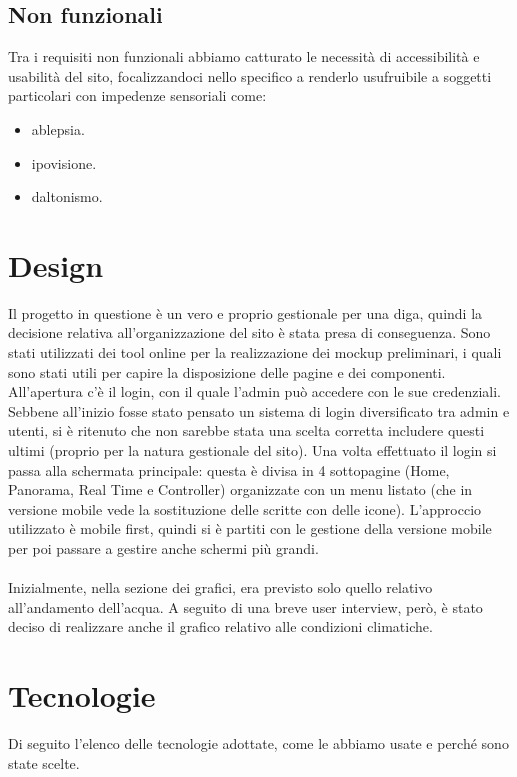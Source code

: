 \documentclass{article}
\begin{document}
\subsection{Non funzionali}
Tra i requisiti non funzionali abbiamo catturato le necessità di accessibilità e usabilità del sito, focalizzandoci nello specifico a renderlo usufruibile a soggetti particolari con impedenze sensoriali come:
\begin{itemize}
	\item ablepsia.
	\item ipovisione.
	\item daltonismo.
\end{itemize}

\section{Design}
Il progetto in questione è un vero e proprio gestionale per una diga, quindi la decisione relativa all'organizzazione del sito è stata presa di conseguenza. Sono stati utilizzati dei tool online per la realizzazione dei mockup preliminari, i quali sono stati utili per capire la disposizione delle pagine e dei componenti.\\
All'apertura c'è il login, con il quale l'admin può accedere con le sue credenziali. Sebbene all'inizio fosse stato pensato un sistema di login diversificato tra admin e utenti, si è ritenuto che non sarebbe stata una scelta corretta includere questi ultimi (proprio per la natura gestionale del sito). Una volta effettuato il login si passa alla schermata principale: questa è divisa in 4 sottopagine (Home, Panorama, Real Time e Controller) organizzate con un menu listato (che in versione mobile vede la sostituzione delle scritte con delle icone). L'approccio utilizzato è mobile first, quindi si è partiti con le gestione della versione mobile per poi passare a gestire anche schermi più grandi.\\\\
Inizialmente, nella sezione dei grafici, era previsto solo quello relativo all'andamento dell'acqua. A seguito di una breve user interview, però, è stato deciso di realizzare anche il grafico relativo alle condizioni climatiche.

\section{Tecnologie}
Di seguito l'elenco delle tecnologie adottate, come le abbiamo usate e perché sono state scelte.
\end{document}
